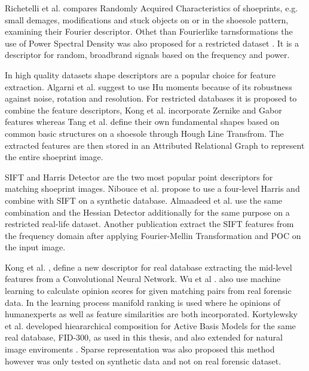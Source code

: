 \documentclass[draft,final]{vutinfth} %
\begin{document}
Richetelli et al. \cite{richetelli2017quantitative} compares Randomly Acquired Characteristics of shoeprints, e.g. small demages, modifications and stuck objects on or in the shoesole pattern, examining their Fourier descriptor.
Othet than Fourierlike tarnsformations the use of Power Spectral Density was also proposed for a restricted dataset \cite{dardi2009texture}.
It is a descriptor for random, broadbrand signals based on the frequency and power.
\par
In high quality datasets shape descriptors are a popular choice for feature extraction.
Algarni et al. \cite{algarni2008novel} suggest to use Hu moments because of its robustness against noise, rotation and resolution.
For restricted databases it is proposed to combine the feature descriptors, Kong et al. \cite{kong2014novel} incorporate Zernike and Gabor features whereas Tang et al. \cite{tang2010footwear} define their own fundamental shapes based on common basic structures on a shoesole through Hough Line Transfrom.
The extracted features are then stored in an Attributed Relational Graph to represent the entire shoeprint image.
\par
SIFT and Harris Detector are the two most popular point descriptors for matching shoeprint images.
Nibouce et al. \cite{nibouche2009rotation} propose to use a four-level Harris and combine with SIFT on a synthetic database.
Almaadeed et al. \cite{almaadeed2015partial} use the same combination and the Hessian Detector additionally for the same purpose on a restricted real-life dataset.
Another publication \cite{richetelli2017classification} extract the SIFT features from the frequency domain after applying Fourier-Mellin Transformation and POC on the input image.
\par
Kong et al. \cite{kong2017cross}, \cite{kong2019cross} define a new descriptor for real database extracting the mid-level features from a Convolutional Neural Network.
Wu et al .\cite{wu2019losgsr} also use machine learning to calculate opinion scores for given matching pairs from real forensic data.
In the learning process manifold ranking is used where he opinions of humanexperts as well as feature similarities are both incorporated.
Kortylewsky et al. \cite{kortylewski2016probabilistic} developed hieararchical composition for Active Basis Models for the same real database, FID-300, as used in this thesis, and also extended for natural image enviroments \cite{kortylewski2019greedy}.
Sparse representation was also proposed \cite{alizadeh2017automatic} this method however was only tested on synthetic data and not on real forensic dataset.
\end{document}
